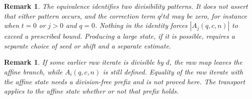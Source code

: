 \documentclass[11pt,letterpaper]{article}
\newtheorem{remark}[theorem]{Remark}
\begin{document}
\begin{remark}
\label{rem:not-a-large-state}
The equivalence identifies two divisibility patterns. It does not assert that
either pattern occurs, and the correction term \(q^j td\) may be zero, for
instance when \(t=0\) or \(j>0\) and \(q=0\). Nothing in the identity forces
\(|A_j(q,c,n)|\) to exceed a prescribed bound. Producing a large state, if it
is possible, requires a separate choice of seed or shift and a separate
estimate.
\end{remark}

\begin{remark}
\label{rem:not-the-raw-orbit}
If some earlier raw iterate is divisible by \(d\), the raw map leaves the
affine branch, while \(A_i(q,c,n)\) is still defined. Equality of the raw
iterate with the affine state needs a division-free prefix and is not proved
here. The transport applies to the affine state whether or not that prefix
holds.
\end{remark}
\end{document}
